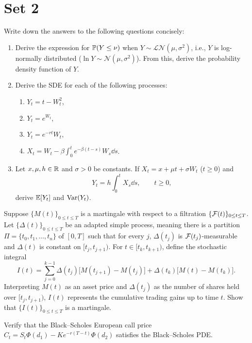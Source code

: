 \section{Set 2}
\begin{problem}
    Write down the answers to the following questions concisely:
    \begin{enumerate}
        \item Derive the expression for $\mathbb{P}(Y \leq \nu)$ when $Y \sim \mathcal{LN}(\mu, \sigma^2)$, i.e., $Y$ is log-normally distributed ($\ln Y \sim \mathcal{N}(\mu, \sigma^2)$). From this, derive the probability density function of $Y$.
        \item Derive the SDE for each of the following processes:
        \begin{enumerate}
            \item $Y_t = t - W_t^2$,
            \item $Y_t = e^{W_t}$,
            \item $Y_t = e^{-rt} W_t$,
            \item $X_t = W_t - \beta \int_0^t e^{-\beta(t-s)} W_s\dd s$.
        \end{enumerate}
        \item Let $x, \mu, h \in \mathbb{R}$ and $\sigma > 0$ be constants. If $X_t = x + \mu t + \sigma W_t$ ($t \geq 0$) and
        \[
        Y_t = h \int_0^t X_s\dd s, \qquad t \geq 0,
        \]
        derive $\mathbb{E}[Y_t]$ and $\operatorname{Var}(Y_t)$.
    \end{enumerate}
\end{problem}

\begin{problem}
    Suppose $\{M(t)\}_{0 \leq t \leq T}$ is a martingale with respect to a filtration $\{\mathcal{F}(t)\}_{0 \leq t \leq T}$. Let $\{\Delta(t)\}_{0 \leq t \leq T}$ be an adapted simple process, meaning there is a partition $\Pi = \{t_0, t_1, \ldots, t_n\}$ of $[0, T]$ such that for every $j$, $\Delta(t_j)$ is $\mathcal{F}(t_j)$-measurable and $\Delta(t)$ is constant on $[t_j, t_{j+1})$. For $t \in [t_k, t_{k+1})$, define the stochastic integral
    \[
    I(t) = \sum_{j=0}^{k-1} \Delta(t_j)\bigl[M(t_{j+1}) - M(t_j)\bigr] + \Delta(t_k)\bigl[M(t) - M(t_k)\bigr].
    \]
    Interpreting $M(t)$ as an asset price and $\Delta(t_j)$ as the number of shares held over $[t_j, t_{j+1})$, $I(t)$ represents the cumulative trading gains up to time $t$. Show that $\{I(t)\}_{0 \leq t \leq T}$ is a martingale.
\end{problem}

\begin{problem}
    Verify that the Black--Scholes European call price $C_t = S_t\Phi(d_1) - K e^{-r(T-t)}\Phi(d_2)$ satisfies the Black--Scholes PDE.
\end{problem}

